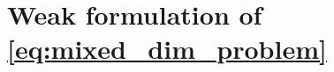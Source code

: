 \documentclass[a4paper]{article}
\numberwithin{equation}{section}
\def\agrad{\widetilde\nabla}
\def\avg#1{\left\{\mskip-5mu\left\{#1\right\}\mskip-5mu\right\}}
\def\CC{\tn C}
\def\d {\,{\rm d}}
\def\ddt#1{\frac{\d #1}{\d t}}
\def\dt{\prtl_t}
\def\dual#1#2{\left\langle #1,#2\right\rangle}
\def\FF{\vc F}
\def\jmp#1{\left\llbracket #1 \right\rrbracket}
\def\nnu{\boldsymbol\nu}
\def\prtl{\partial}
\def\tn#1{{\mathbb{#1}}}    %
\def\ttraction{\vc t}
\def\U{\vc U}
\def\Vel{{\boldsymbol{\mathcal V}}} %
\def\Vf{{\mathcal V}} %
\def\vc#1{\mathbf{#1}}     %
\newcommand{\ml}[1]{\begin{multline}#1\end{multline}}
\newcommand{\mls}[1]{\begin{multline*}#1\end{multline*}}
\begin{document}



\section{Weak formulation of \eqref{eq:mixed_dim_problem}}\label{sec:app_weak_form}
\end{document}

